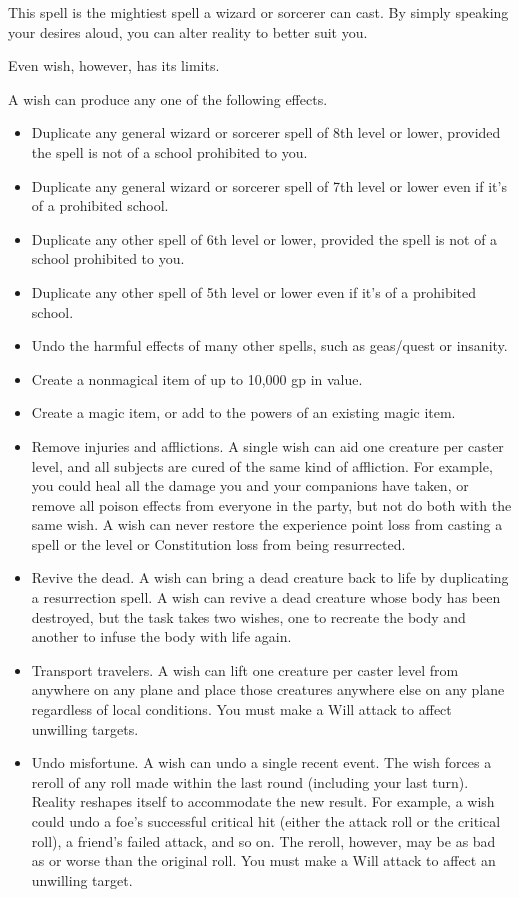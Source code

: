 \spelleffect This spell is the mightiest spell a wizard or sorcerer can cast. By simply speaking your desires aloud, you can alter reality to better suit you.
\par Even wish, however, has its limits.
\par A wish can produce any one of the following effects.
\begin{itemize}
    \item Duplicate any general wizard or sorcerer spell of 8th level or lower, provided the spell is not of a school prohibited to you.
    \item Duplicate any general wizard or sorcerer spell of 7th level or lower even if it's of a prohibited school.
    \item Duplicate any other spell of 6th level or lower, provided the spell is not of a school prohibited to you.
    \item Duplicate any other spell of 5th level or lower even if it's of a prohibited school. 
    \item Undo the harmful effects of many other spells, such as geas/quest or insanity.
    \item Create a nonmagical item of up to 10,000 gp in value.
    \item Create a magic item, or add to the powers of an existing magic item.
    \item Remove injuries and afflictions. A single wish can aid one creature per caster level, and all subjects are cured of the same kind of affliction. For example, you could heal all the damage you and your companions have taken, or remove all poison effects from everyone in the party, but not do both with the same wish. A wish can never restore the experience point loss from casting a spell or the level or Constitution loss from being resurrected.
    \item Revive the dead. A wish can bring a dead creature back to life by duplicating a resurrection spell. A wish can revive a dead creature whose body has been destroyed, but the task takes two wishes, one to recreate the body and another to infuse the body with life again.
    \item Transport travelers. A wish can lift one creature per caster level from anywhere on any plane and place those creatures anywhere else on any plane regardless of local conditions. You must make a Will attack to affect unwilling targets.
    \item Undo misfortune. A wish can undo a single recent event. The wish forces a reroll of any roll made within the last round (including your last turn). Reality reshapes itself to accommodate the new result. For example, a wish could undo a foe's successful critical hit (either the attack roll or the critical roll), a friend's failed attack, and so on. The reroll, however, may be as bad as or worse than the original roll. You must make a Will attack to affect an unwilling target.
\end{itemize}
